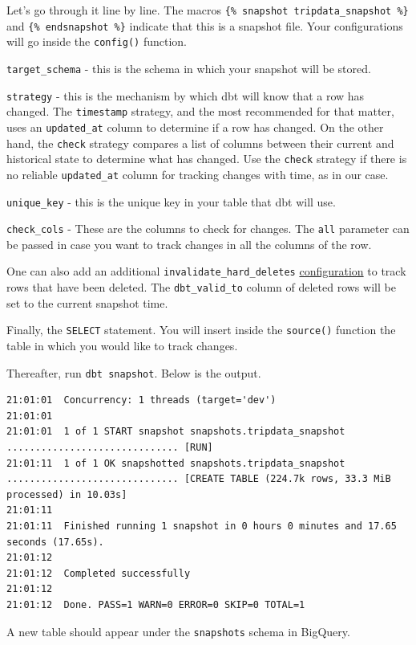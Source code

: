 \documentclass[
]{book}
\begin{document}
Let's go through it line by line. The macros \texttt{\{\%\ snapshot\ tripdata\_snapshot\ \%\}} and \texttt{\{\%\ endsnapshot\ \%\}} indicate that this is a snapshot file. Your configurations will go inside the \texttt{config()} function.

\texttt{target\_schema} - this is the schema in which your snapshot will be stored.

\texttt{strategy} - this is the mechanism by which dbt will know that a row has changed. The \texttt{timestamp} strategy, and the most recommended for that matter, uses an \texttt{updated\_at} column to determine if a row has changed. On the other hand, the \texttt{check} strategy compares a list of columns between their current and historical state to determine what has changed. Use the \texttt{check} strategy if there is no reliable \texttt{updated\_at} column for tracking changes with time, as in our case.

\texttt{unique\_key} - this is the unique key in your table that dbt will use.

\texttt{check\_cols} - These are the columns to check for changes. The \texttt{all} parameter can be passed in case you want to track changes in all the columns of the row.

One can also add an additional \texttt{invalidate\_hard\_deletes} \href{https://docs.getdbt.com/docs/build/snapshots}{configuration} to track rows that have been deleted. The \texttt{dbt\_valid\_to} column of deleted rows will be set to the current snapshot time.

Finally, the \texttt{SELECT} statement. You will insert inside the \texttt{source()} function the table in which you would like to track changes.

Thereafter, run \texttt{dbt\ snapshot}. Below is the output.

\begin{verbatim}
21:01:01  Concurrency: 1 threads (target='dev')
21:01:01  
21:01:01  1 of 1 START snapshot snapshots.tripdata_snapshot .............................. [RUN]
21:01:11  1 of 1 OK snapshotted snapshots.tripdata_snapshot .............................. [CREATE TABLE (224.7k rows, 33.3 MiB processed) in 10.03s]
21:01:11  
21:01:11  Finished running 1 snapshot in 0 hours 0 minutes and 17.65 seconds (17.65s).
21:01:12  
21:01:12  Completed successfully
21:01:12  
21:01:12  Done. PASS=1 WARN=0 ERROR=0 SKIP=0 TOTAL=1
\end{verbatim}

A new table should appear under the \texttt{snapshots} schema in BigQuery.
\end{document}
